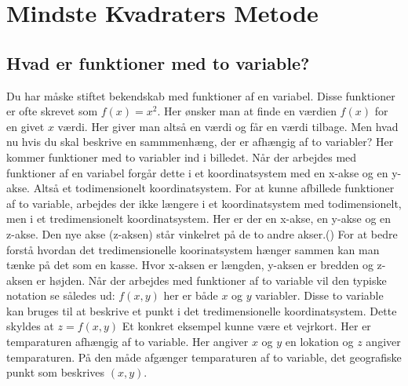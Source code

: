 \section{Mindste Kvadraters Metode}



\subsection{Hvad er funktioner med to variable?}
Du har måske stiftet bekendskab med funktioner af en variabel. Disse funktioner er ofte skrevet som \begin{math}f(x) = x^2\end{math}. Her ønsker man at finde en værdien $f(x)$ for en givet $x$ værdi. Her giver man altså en værdi og får en værdi tilbage. Men hvad nu hvis du skal beskrive en sammmenhæng, der er afhængig af to variabler? Her kommer funktioner med to variabler ind i billedet. Når der arbejdes med funktioner af en variabel forgår dette i et koordinatsystem med en x-akse og en y-akse. Altså et todimensionelt koordinatsystem. For at kunne afbillede funktioner af to variable, arbejdes der ikke længere i et koordinatsystem med todimensionelt, men i et tredimensionelt koordinatsystem. Her er der en x-akse, en y-akse og en z-akse. Den nye akse (z-aksen) står vinkelret på de to andre akser.(\cite[246-248]{funktionrAfToVariable}) For at bedre forstå hvordan det tredimensionelle  koorinatsystem hænger sammen kan man tænke på det som en kasse. Hvor x-aksen er længden, y-aksen er bredden og z-aksen er højden. Når der arbejdes med funktioner af to variable vil den typiske notation se således ud: $f(x,y)$ her er både $x$ og $y$ variabler. Disse to variable kan bruges til at beskrive et punkt i det tredimensionelle koordinatsystem. Dette skyldes at $z = f(x,y)$ Et konkret eksempel kunne være et vejrkort. Her er temparaturen afhængig af to variable. Her angiver $x$ og $y$ en lokation og $z$ angiver temparaturen. På den måde afgænger temparaturen af to variable, det geografiske punkt som beskrives $(x,y)$.\\


